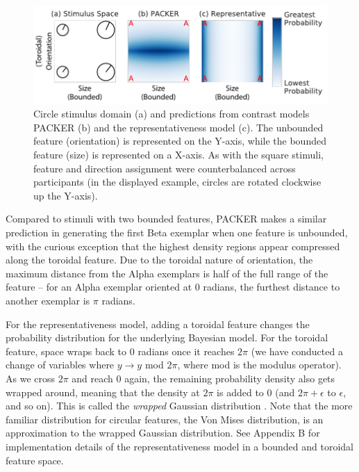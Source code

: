 \documentclass[pdflatex,sn-apa]{sn-jnl}%
\theoremstyle{thmstyleone}%
\theoremstyle{thmstyletwo}%
\theoremstyle{thmstylethree}%
\begin{document}
\begin{figure}[p]
    \begin{center} 
      \includegraphics[width=.8\textwidth]{figs/e3-circles.pdf}
      \caption{Circle stimulus domain (a) and predictions from contrast models
        PACKER (b) and the representativeness model (c). The unbounded feature
        (orientation) is represented on the Y-axis, while the bounded feature
        (size) is represented on a X-axis. As with the square stimuli, feature
        and direction assignment were counterbalanced across participants (in
        the displayed example, circles are rotated clockwise up the Y-axis). }
      \label{fig:e3-circles}
    \end{center}
\end{figure}


Compared to stimuli with two bounded features, PACKER makes a similar prediction
in generating the first Beta exemplar when one feature is unbounded, with the
curious exception that the highest density regions appear compressed along the
toroidal feature. Due to the toroidal nature of orientation, the maximum
distance from the Alpha exemplars is half of the full range of the feature --
for an Alpha exemplar oriented at 0 radians, the furthest distance to another
exemplar is $\pi$ radians.

For the representativeness model, adding a toroidal feature changes the
probability distribution for the underlying Bayesian model. For the toroidal
feature, space wraps back to $0$ radians once it reaches $2\pi$ (we have
conducted a change of variables where $y \rightarrow y$ mod $2\pi$, where mod is
the modulus operator). As we cross $2\pi$ and reach $0$ again, the remaining
probability density also gets wrapped around, meaning that the density at $2\pi$
is added to $0$ (and $2\pi + \epsilon$ to $\epsilon$, and so on). This is called
the {\em wrapped} Gaussian distribution \citep{mardia1972}. Note that the more
familiar distribution for circular features, the Von Mises distribution, is an
approximation to the wrapped Gaussian distribution. See Appendix B for
implementation details of the representativeness model in a bounded and
toroidal feature space.
\end{document}
